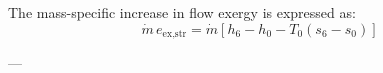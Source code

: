 The mass-specific increase in flow exergy is expressed as:  
\[
\dot{m} \, e_{\text{ex},\text{str}} = \dot{m} \left[ h_6 - h_0 - T_0 (s_6 - s_0) \right]
\]

---